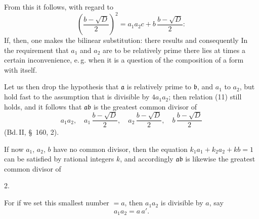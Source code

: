 From this it follows, with regard to
\[
\left(\frac{b-\sqrt D}{2}\right)^2 = a_1 a_2 c + b\,\frac{b-\sqrt D}{2}:
\]
If, then, one makes the bilinear substitution:
there results
and consequently
In the requirement that $a_1$ and $a_2$ are to be relatively prime there lies at times a certain inconvenience, e.\,g. when it is a question of the composition of a form with itself.

Let us then drop the hypothesis that $\mathfrak{a}$ is relatively prime to $\mathfrak{b}$, and $a_1$ to $a_2$, but hold fast to the assumption that
is divisible by $4 a_1 a_2$; then relation (11) still holds, and it follows that $\mathfrak{a}\mathfrak{b}$ is the greatest common divisor of
\[
a_1 a_2, \quad a_1\,\frac{b-\sqrt D}{2}, \quad a_2\,\frac{b-\sqrt D}{2}, \quad b\,\frac{b-\sqrt D}{2}
\]
(Bd.\,II, §~160, 2).

If now $a_1$, $a_2$, $b$ have no common divisor, then the equation $k_1 a_1 + k_2 a_2 + kb = 1$ can be satisfied by rational integers $k$, and accordingly $\mathfrak{a}\mathfrak{b}$ is likewise the greatest common divisor of

2. 

For if we set this smallest number $=a$, then $a_1 a_2$ is divisible by $a$, say
\[
a_1 a_2 = a\,a'.
\]
